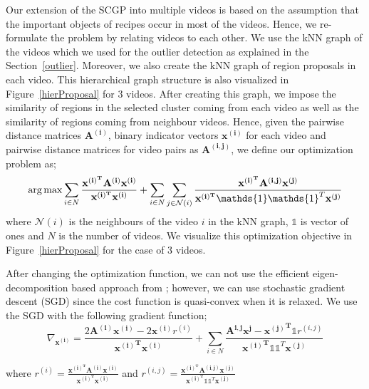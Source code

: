 Our extension of the SCGP into multiple videos is based on the assumption that the important objects of recipes occur in most of the videos. Hence, we re-formulate the problem by relating videos to each other. We use the kNN graph of the videos which we used for the outlier detection as explained in the Section~\ref{outlier}. Moreover, we also create the kNN graph of region proposals in each video. This hierarchical graph structure is also visualized in Figure~\ref{hierProposal} for 3 videos. After creating this graph, we impose the similarity of regions in the selected cluster coming from each video as well as the similarity of regions coming from neighbour videos. Hence, given the pairwise distance matrices $\mathbf{A^{(i)}}$, binary indicator vectors $\mathbf{x^{(i)}}$ for each video and pairwise distance matrices for video pairs as $\mathbf{A^{(i,j)}}$, we define our optimization problem as;
\begin{equation}
\argmax \sum_{i \in N} \frac{\mathbf{x^{(i)^T}}\mathbf{A^{(i)}}\mathbf{x^{(i)}}}{\mathbf{x^{(i)^T}}\mathbf{x^{(i)}}} +
\sum_{i \in N} \sum_{j \in \mathcal{N}(i)} \frac{\mathbf{x^{(i)^T}}\mathbf{A^{(i,j)}}\mathbf{x^{(j)}}} {\mathbf{x^{(i)^T}}\mathds{1}\mathds{1}^T\mathbf{x^{(j)}}}
\end{equation}
where $\mathcal{N}(i)$ is the neighbours of the video $i$ in the kNN graph, $\mathds{1}$ is vector of ones and $N$ is the number of videos. We visualize this optimization objective in Figure~\ref{hierProposal} for the case of 3 videos.

After changing the optimization function, we can not use the efficient eigen-decomposition based approach from \cite{scgp,scgp_eigen}; however, we can use stochastic gradient descent (SGD) since the cost function is quasi-convex when it is relaxed. We use the SGD with the following gradient function;
\begin{equation}
  \nabla_{\mathbf{x^{(i)}}} = \frac{2\mathbf{A^{(i)}} \mathbf{x^{(i)}} -2\mathbf{x^{(i)}} r^{(i)}}
  {\mathbf{{x^{(i)}}^T}\mathbf{x^{(i)}}}
+ \sum_{i \in N} \frac{\mathbf{A^{i,j}}\mathbf{x^{j}} - \mathbf{{x^{(j)}}^T} \mathds{1} r^{(i,j)}}{\mathbf{{x^{(i)}}^T} \mathds{1} \mathds{1}^T \mathbf{x^{(j)}} }
\end{equation}

where $r^{(i)}=\frac{\mathbf{x^{(i)^T}}\mathbf{A^{(i)}}\mathbf{x^{(i)}}}{\mathbf{x^{(i)^T}}\mathbf{x^{(i)}}}$ and $r^{(i,j)}=\frac{\mathbf{x^{(i)^T}}\mathbf{A^{(i,j)}}\mathbf{x^{(j)}}} {\mathbf{x^{(i)^T}}\mathds{1}\mathds{1}^T\mathbf{x^{(j)}}}$


